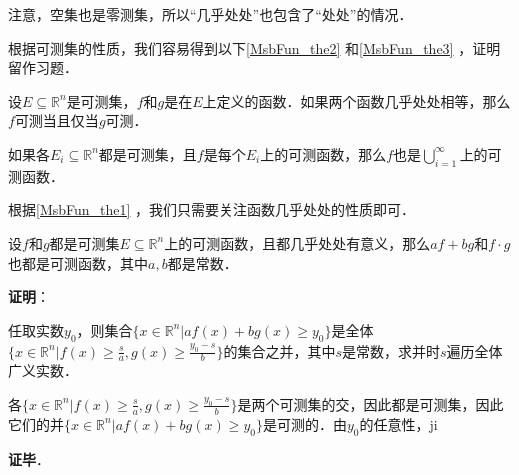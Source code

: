 注意，空集也是零测集，所以“几乎处处”也包含了“处处”的情况．

根据可测集的性质，我们容易得到以下\autoref{MsbFun_the2} 和\autoref{MsbFun_the3} ，证明留作习题．

\begin{theorem}{}\label{MsbFun_the2}
设$E\subseteq\mathbb{R}^n$是可测集，$f$和$g$是在$E$上定义的函数．如果两个函数几乎处处相等，那么$f$可测当且仅当$g$可测．
\end{theorem}



\begin{theorem}{}\label{MsbFun_the3}
如果各$E_i\subseteq\mathbb{R}^n$都是可测集，且$f$是每个$E_i$上的可测函数，那么$f$也是$\bigcup_{i=1}^\infty$上的可测函数．
\end{theorem}

根据\autoref{MsbFun_the1} ，我们只需要关注函数几乎处处的性质即可．

\begin{theorem}{}
设$f$和$g$都是可测集$E\subseteq\mathbb{R}^n$上的可测函数，且都几乎处处有意义，那么$af+bg$和$f\cdot g$也都是可测函数，其中$a, b$都是常数．
\end{theorem}

\textbf{证明}：

任取实数$y_0$，则集合$\{x\in\mathbb{R}^n|af(x)+bg(x)\geq y_0\}$是全体$\{x\in\mathbb{R}^n|f(x)\geq \frac{s}{a}, g(x)\geq \frac{y_0-s}{b}\}$的集合之并，其中$s$是常数，求并时$s$遍历全体广义实数．

各$\{x\in\mathbb{R}^n|f(x)\geq \frac{s}{a}, g(x)\geq \frac{y_0-s}{b}\}$是两个可测集的交，因此都是可测集，因此它们的并$\{x\in\mathbb{R}^n|af(x)+bg(x)\geq y_0\}$是可测的．由$y_0$的任意性，ji

\textbf{证毕}．













